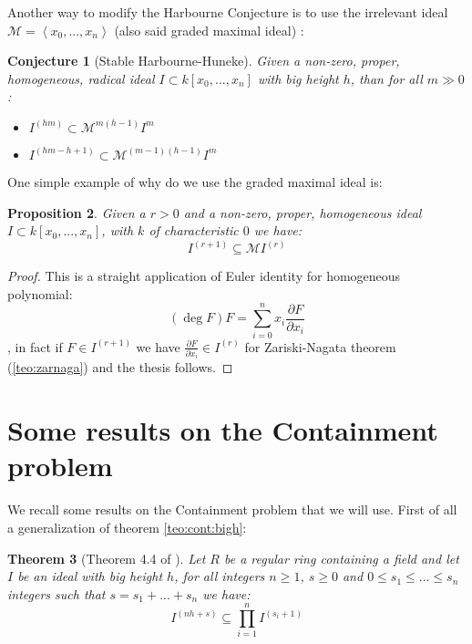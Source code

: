 \documentclass[a4wide]{book}
\theoremstyle{plain}
\newtheorem{teo}{Theorem}[section]
\newtheorem{prop}[teo]{Proposition}
\newtheorem{conj}[teo]{Conjecture}
\theoremstyle{remark}
\theoremstyle{definition}
\newcommand{\parder}[2]{ \frac{\partial #1}{\partial #2} }
\newcommand{\MM}{\mathcal{M}}
\begin{document}
	Another way to modify the Harbourne Conjecture is to use the irrelevant ideal $ \MM=\left\langle x_0 , ... ,x_n \right> $ (also said graded maximal ideal) : 
	
	\begin{conj}[Stable Harbourne-Huneke]\label{conj:stabharbhun}
	Given a non-zero, proper, homogeneous, radical ideal $ I \subset k[x_0 , ... , x_n] $ with big height $ h $, than for all $ m \gg 0 $:
	\begin{itemize}
	\item $ I^{(hm)} \subset \MM^{m(h-1)} I^m$
	\item $ I^{(hm - h +1 )} \subset \MM^{(m-1)(h-1)} I^m $
	\end{itemize}
	\end{conj}
	
	One simple example of why do we use the graded maximal ideal is:
	
	\begin{prop} \label{prop:eulid}
	Given a $ r>0 $ and a non-zero, proper, homogeneous ideal $ I \subset k[x_0 , ... , x_n] $, with $ k $ of characteristic $ 0 $ we have:
	\[ I^{(r+1)}   \subseteq \MM I^{(r)}\]
	\end{prop}
	\begin{proof}
	This is a straight application of Euler identity for homogeneous polynomial:
	\[ (\deg{F})F = \sum_{i=0}^{n} x_i \parder{F}{x_i} \]
	, in fact if $ F \in I^{(r+1)} $ we have $ \parder{F}{x_i} \in I^{(r)} $ for Zariski-Nagata theorem (\ref{teo:zarnaga}) and the thesis follows.
 	\end{proof}
 	

\section{Some results on the Containment problem}

We recall some results on the Containment problem that we will use. First of all a generalization of theorem \ref{teo:cont:bigh}:

\begin{teo}[Theorem 4.4 of \cite{John14}]\label{teo:cont:bighgen}
Let $ R $ be a regular ring containing a field and let $ I $ be an ideal with big height $ h $, for all integers $ n \geq 1 $, $ s \geq 0 $ and $ 0 \leq s_1 \leq  ... \leq s_n $ integers such that $ s = s_1 +  ... + s_n $ we have:
\begin{equation}\label{eq:cont:bighgen}
	I^{(nh + s)} \subseteq \prod_{i=1}^{n} I^{(s_i + 1)}
\end{equation}
\end{teo}
\end{document}
